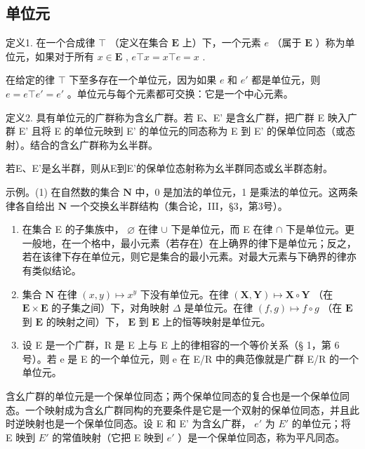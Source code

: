 \subsection{单位元}

定义1. 在一个合成律 \(\top\) （定义在集合 \(\mathbf{E}\) 上）下，一个元素 \(e\) （属于 \(\mathbf{E}\) ）称为单位元，如果对于所有 \(x \in \mathbf{E}\) , \(e \top x = x \top e = x\) .

在给定的律 \(\top\) 下至多存在一个单位元，因为如果 \(e\) 和 \(e'\) 都是单位元，则 \(e = e \top e' = e'\) 。单位元与每个元素都可交换：它是一个中心元素。

定义2. 具有单位元的广群称为含幺广群。若 E、E' 是含幺广群，把广群 E 映入广群 E' 且将 E 的单位元映到 E' 的单位元的同态称为 E 到 E' 的保单位同态（或态射）。结合的含幺广群称为幺半群。

若E、E'是幺半群，则从E到E'的保单位态射称为幺半群同态或幺半群态射。

示例。(1) 在自然数的集合 \(\mathbf{N}\) 中，0 是加法的单位元，1 是乘法的单位元。这两条律各自给出 \(\mathbf{N}\) 一个交换幺半群结构（集合论，III，§3，第3号）。

\begin{enumerate}
\def\labelenumi{(\arabic{enumi})}
\setcounter{enumi}{1}
\item
  在集合 E 的子集族中， \(\varnothing\) 在律 \(\cup\) 下是单位元，而 E 在律 \(\cap\) 下是单位元。更一般地，在一个格中，最小元素（若存在）在上确界的律下是单位元；反之，若在该律下存在单位元，则它是集合的最小元素。对最大元素与下确界的律亦有类似结论。
\item
  集合 \(\mathbf{N}\) 在律 \((x, y) \mapsto x^y\) 下没有单位元。在律 \((\mathbf{X}, \mathbf{Y}) \mapsto \mathbf{X} \circ \mathbf{Y}\) （在 \(\mathbf{E} \times \mathbf{E}\) 的子集之间）下，对角映射 \(\Delta\) 是单位元。在律 \((f, g) \mapsto f \circ g\) （在 \(\mathbf{E}\) 到 \(\mathbf{E}\) 的映射之间）下， \(\mathbf{E}\) 到 \(\mathbf{E}\) 上的恒等映射是单位元。
\item
  设 E 是一个广群，R 是 E 上与 E 上的律相容的一个等价关系（§ 1，第 6 号）。若 e 是 E 的一个单位元，则 e 在 E/R 中的典范像就是广群 E/R 的一个单位元。
\end{enumerate}

含幺广群的单位元是一个保单位同态；两个保单位同态的复合也是一个保单位同态。一个映射成为含幺广群同构的充要条件是它是一个双射的保单位同态，并且此时逆映射也是一个保单位同态。设 E 和 E' 为含幺广群， \(e'\) 为 \(E'\) 的单位元；将 E 映到 \(E'\) 的常值映射（它把 E 映到 \(e'\) ）是一个保单位同态，称为平凡同态。

